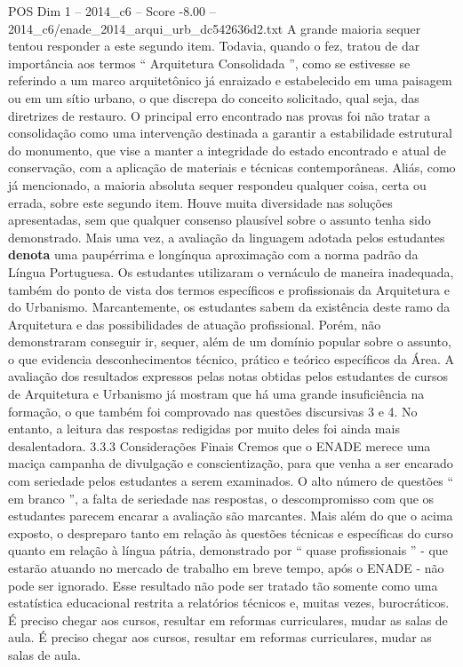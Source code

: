 \begin{textsample}{POS Dim 1 – 2014\_c6 – Score -8.00 – 2014\_c6/enade\_2014\_arqui\_urb\_dc542636d2.txt}
A grande maioria sequer tentou responder a este segundo item.
Todavia, quando o fez, tratou de dar importância aos termos “ Arquitetura Consolidada ”, como se estivesse se referindo a um marco arquitetônico já enraizado e estabelecido em uma paisagem ou em um sítio urbano, o que discrepa do conceito solicitado, qual seja, das diretrizes de restauro.
O principal erro encontrado nas provas foi não tratar a consolidação como uma intervenção destinada a garantir a estabilidade estrutural do monumento, que vise a manter a integridade do estado encontrado e atual de conservação, com a aplicação de materiais e técnicas contemporâneas.
Aliás, como já mencionado, a maioria absoluta sequer respondeu qualquer coisa, certa ou errada, sobre este segundo item.
Houve muita diversidade nas soluções apresentadas, sem que qualquer consenso plausível sobre o assunto tenha sido demonstrado.
Mais uma vez, a avaliação da linguagem adotada pelos estudantes \textbf{denota} uma paupérrima e longínqua aproximação com a norma padrão da Língua Portuguesa.
Os estudantes utilizaram o vernáculo de maneira inadequada, também do ponto de vista dos termos específicos e profissionais da Arquitetura e do Urbanismo.
Marcantemente, os estudantes sabem da existência deste ramo da Arquitetura e das possibilidades de atuação profissional.
Porém, não demonstraram conseguir ir, sequer, além de um domínio popular sobre o assunto, o que evidencia desconhecimentos técnico, prático e teórico específicos da Área.
A avaliação dos resultados expressos pelas notas obtidas pelos estudantes de cursos de Arquitetura e Urbanismo já mostram que há uma grande insuficiência na formação, o que também foi comprovado nas questões discursivas 3 e 4.
No entanto, a leitura das respostas redigidas por muito deles foi ainda mais desalentadora. 3.3.3 Considerações Finais Cremos que o ENADE merece uma maciça campanha de divulgação e conscientização, para que venha a ser encarado com seriedade pelos estudantes a serem examinados.
O alto número de questões “ em branco ”, a falta de seriedade nas respostas, o descompromisso com que os estudantes parecem encarar a avaliação são marcantes.
Mais além do que o acima exposto, o despreparo tanto em relação às questões técnicas e específicas do curso quanto em relação à língua pátria, demonstrado por “ quase profissionais ” - que estarão atuando no mercado de trabalho em breve tempo, após o ENADE - não pode ser ignorado.
Esse resultado não pode ser tratado tão somente como uma estatística educacional restrita a relatórios técnicos e, muitas vezes, burocráticos.
É preciso chegar aos cursos, resultar em reformas curriculares, mudar as salas de aula.
É preciso chegar aos cursos, resultar em reformas curriculares, mudar as salas de aula.

\end{textsample}
